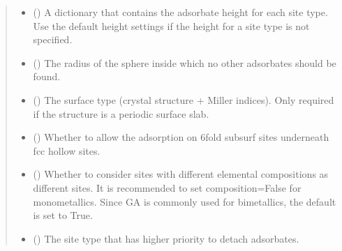 \documentclass[letterpaper,10pt,english]{sphinxmanual}
\begin{document}
\begin{fulllineitems}
\begin{quote}
\begin{description}
\begin{itemize}
\item {} 
 (\sphinxstyleliteralemphasis{\sphinxupquote{, }}) \textendash{} A dictionary that contains the adsorbate height for each site
type. Use the default height settings if the height for a site
type is not specified.

\item {} 
 (\sphinxstyleliteralemphasis{\sphinxupquote{, }}) \textendash{} The radius of the sphere inside which no other adsorbates
should be found.

\item {} 
 (\sphinxstyleliteralemphasis{\sphinxupquote{, }}) \textendash{} The surface type (crystal structure + Miller indices).
Only required if the structure is a periodic surface slab.

\item {} 
 (\sphinxstyleliteralemphasis{\sphinxupquote{, }}) \textendash{} Whether to allow the adsorption on 6\sphinxhyphen{}fold subsurf sites
underneath fcc hollow sites.

\item {} 
 (\sphinxstyleliteralemphasis{\sphinxupquote{, }}) \textendash{} Whether to consider sites with different elemental compositions
as different sites. It is recommended to set composition=False
for monometallics. Since GA is commonly used for bimetallics,
the default is set to True.

\item {} 
 (\sphinxstyleliteralemphasis{\sphinxupquote{, }}) \textendash{} The site type that has higher priority to detach adsorbates.


\end{itemize}
\end{description}
\end{quote}
\end{fulllineitems}
\end{document}
